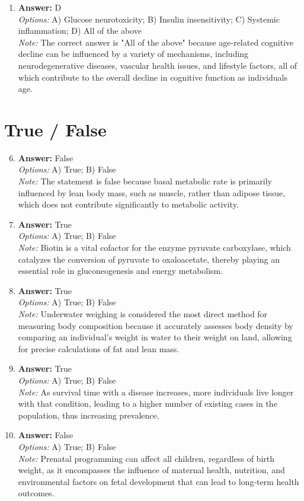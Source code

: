\documentclass[12pt]{article}
\begin{document}
\begin{enumerate}[label=\arabic*.]
\item \textbf{Answer:} D
\\ \textit{Options:} A) Glucose neurotoxicity; B) Insulin insensitivity; C) Systemic inflammation; D) All of the above
\\ \textit{Note:} The correct answer is "All of the above" because age-related cognitive decline can be influenced by a variety of mechanisms, including neurodegenerative diseases, vascular health issues, and lifestyle factors, all of which contribute to the overall decline in cognitive function as individuals age.
\end{enumerate}

\section*{True / False}
\begin{enumerate}[label=\arabic*.]
\setcounter{enumi}{5}
\item \textbf{Answer:} False
\\ \textit{Options:} A) True; B) False
\\ \textit{Note:} The statement is false because basal metabolic rate is primarily influenced by lean body mass, such as muscle, rather than adipose tissue, which does not contribute significantly to metabolic activity.
\item \textbf{Answer:} True
\\ \textit{Options:} A) True; B) False
\\ \textit{Note:} Biotin is a vital cofactor for the enzyme pyruvate carboxylase, which catalyzes the conversion of pyruvate to oxaloacetate, thereby playing an essential role in gluconeogenesis and energy metabolism.
\item \textbf{Answer:} True
\\ \textit{Options:} A) True; B) False
\\ \textit{Note:} Underwater weighing is considered the most direct method for measuring body composition because it accurately assesses body density by comparing an individual's weight in water to their weight on land, allowing for precise calculations of fat and lean mass.
\item \textbf{Answer:} True
\\ \textit{Options:} A) True; B) False
\\ \textit{Note:} As survival time with a disease increases, more individuals live longer with that condition, leading to a higher number of existing cases in the population, thus increasing prevalence.
\item \textbf{Answer:} False
\\ \textit{Options:} A) True; B) False
\\ \textit{Note:} Prenatal programming can affect all children, regardless of birth weight, as it encompasses the influence of maternal health, nutrition, and environmental factors on fetal development that can lead to long-term health outcomes.
\end{enumerate}
\end{document}
